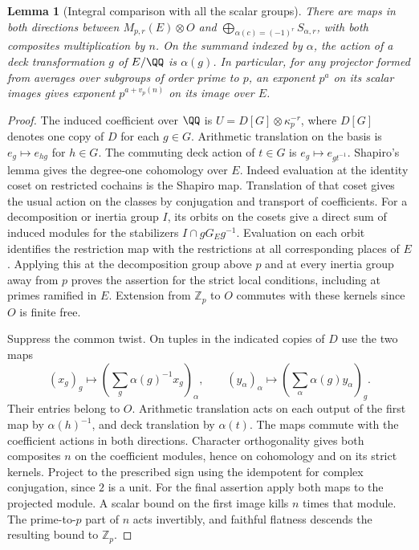 \documentclass[a4paper,11pt]{article}
\newtheorem{lemma}[proposition]{Lemma}
\theoremstyle{definition}
\theoremstyle{remark}
\newcommand{\ZZ}{\mathbb Z}\newcommand{\ord}{\operatorname{ord}}
\numberwithin{equation}{section}
\begin{document}
\begin{lemma}[Integral comparison with all the scalar groups]
\label{lem:fourier231}
There are maps in both directions between \(M_{p,r}(E)\otimes O\)
and \(\bigoplus_{\alpha(c)=(-1)^r} S_{\alpha,r}\), with both
composites multiplication by \(n\). On the summand indexed by
\(\alpha\), the action of a deck transformation \(g\) of \(E/\QQ\)
is \(\alpha(g)\). In particular, for any projector formed from
averages over subgroups of order prime to \(p\), an exponent
\(p^a\) on its scalar images gives exponent \(p^{a+v_p(n)}\)
on its image over \(E\).
\end{lemma}
\begin{proof}
The induced coefficient over \(\QQ\) is
\(U=D[G]\otimes\kappa_p^{-r}\), where \(D[G]\) denotes one copy of
\(D\) for each \(g\in G\). Arithmetic translation on the basis is
\(e_g\mapsto e_{hg}\) for \(h\in G\). The commuting deck action
of \(t\in G\) is \(e_g\mapsto e_{gt^{-1}}\).
Shapiro's lemma gives the degree-one cohomology over \(E\).
Indeed evaluation at the identity coset on restricted cochains
is the Shapiro map. Translation of that coset gives the usual
action on the classes by conjugation and transport of coefficients.
For a decomposition or inertia group \(I\), its orbits on the cosets
give a direct sum of induced modules for the stabilizers
\(I\cap gG_Eg^{-1}\). Evaluation on each orbit identifies the
restriction map with the restrictions at all corresponding places
of \(E\). Applying this at the decomposition group above \(p\)
and at every inertia group away from \(p\) proves the assertion
for the strict local conditions, including at primes ramified in
\(E\). Extension from \(\ZZ_p\) to \(O\) commutes with these kernels
since \(O\) is finite free.

Suppress the common twist. On tuples in the indicated copies of
\(D\) use the two maps
\[
 (x_g)_g\longmapsto
       \left(\sum_g\alpha(g)^{-1}x_g\right)_\alpha ,
 \qquad
 (y_\alpha)_\alpha\longmapsto
       \left(\sum_\alpha\alpha(g)y_\alpha\right)_g .
\]
Their entries belong to \(O\). Arithmetic translation acts on
each output of the first map by \(\alpha(h)^{-1}\), and deck
translation by \(\alpha(t)\). The maps commute with the coefficient
actions in both directions. Character orthogonality gives both
composites \(n\) on the coefficient modules, hence on cohomology
and on its strict kernels. Project to the prescribed sign using
the idempotent for complex conjugation, since \(2\) is a unit.
For the final assertion apply both maps to the projected module.
A scalar bound on the first image kills \(n\) times that module.
The prime-to-\(p\) part of \(n\) acts invertibly, and faithful
flatness descends the resulting bound to \(\ZZ_p\).
\end{proof}
\end{document}
